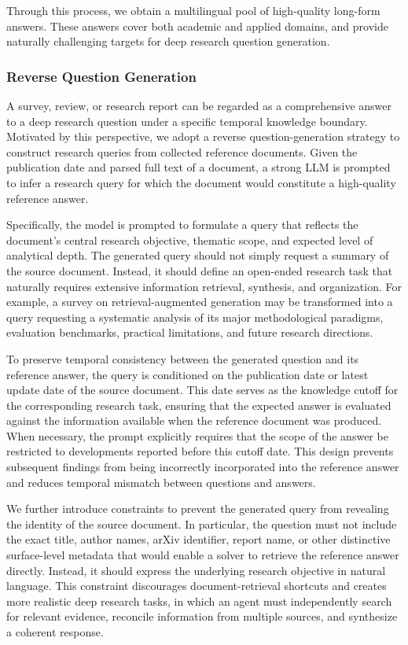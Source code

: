 \documentclass{huawei}
\begin{document}
Through this process, we obtain a multilingual pool of high-quality long-form answers. These answers cover both academic and applied domains, and provide naturally challenging targets for deep research question generation.



\subsubsection{Reverse Question Generation}
A survey, review, or research report can be regarded as a comprehensive answer to a deep research question under a specific temporal knowledge boundary. Motivated by this perspective, we adopt a reverse question-generation strategy to construct research queries from collected reference documents. Given the publication date and parsed full text of a document, a strong LLM is prompted to infer a research query for which the document would constitute a high-quality reference answer.


Specifically, the model is prompted to formulate a query that reflects the document's central research objective, thematic scope, and expected level of analytical depth. The generated query should not simply request a summary of the source document. Instead, it should define an open-ended research task that naturally requires extensive information retrieval, synthesis, and organization. For example, a survey on retrieval-augmented generation may be transformed into a query requesting a systematic analysis of its major methodological paradigms, evaluation benchmarks, practical limitations, and future research directions.



To preserve temporal consistency between the generated question and its reference answer, the query is conditioned on the publication date or latest update date of the source document. This date serves as the knowledge cutoff for the corresponding research task, ensuring that the expected answer is evaluated against the information available when the reference document was produced. When necessary, the prompt explicitly requires that the scope of the answer be restricted to developments reported before this cutoff date. This design prevents subsequent findings from being incorrectly incorporated into the reference answer and reduces temporal mismatch between questions and answers.



We further introduce constraints to prevent the generated query from revealing the identity of the source document. In particular, the question must not include the exact title, author names, arXiv identifier, report name, or other distinctive surface-level metadata that would enable a solver to retrieve the reference answer directly. Instead, it should express the underlying research objective in natural language. This constraint discourages document-retrieval shortcuts and creates more realistic deep research tasks, in which an agent must independently search for relevant evidence, reconcile information from multiple sources, and synthesize a coherent response.
\end{document}
